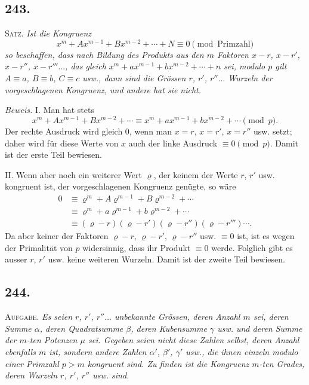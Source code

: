 \documentclass[12pt]{article}
\begin{document}
\subsection*{243.}
\textsc{Satz.} \textit{Ist die Kongruenz}
\[
x^m+A x^{m-1}+B x^{m-2}+\cdots+N\equiv 0\pmod{\text{Primzahl}}
\]
\textit{so beschaffen, dass nach Bildung des Produkts aus den $m$ Faktoren $x-r$, $x-r'$, $x-r''$, $x-r'''\ldots$, das gleich $x^m+a x^{m-1}+b x^{m-2}+\cdots+n$ sei, modulo $p$ gilt $A\equiv a$, $B\equiv b$, $C\equiv c$ usw., dann sind die Grössen $r$, $r'$, $r''\ldots$ Wurzeln der vorgeschlagenen Kongruenz, und andere hat sie nicht.}

\textit{Beweis.} I. Man hat stets
\[
x^m+A x^{m-1}+B x^{m-2}+\cdots \equiv x^m+a x^{m-1}+b x^{m-2}+\cdots \pmod p.
\]
Der rechte Ausdruck wird gleich $0$, wenn man $x=r$, $x=r'$, $x=r''$ usw. setzt; daher wird für diese Werte von $x$ auch der linke Ausdruck $\equiv 0\pmod p$. Damit ist der erste Teil bewiesen.

II. Wenn aber noch ein weiterer Wert $\varrho$, der keinem der Werte $r$, $r'$ usw. kongruent ist, der vorgeschlagenen Kongruenz genügte, so wäre
\[
\begin{aligned}
0&\equiv \varrho^m+A\varrho^{m-1}+B\varrho^{m-2}+\cdots \\
&\equiv \varrho^m+a\varrho^{m-1}+b\varrho^{m-2}+\cdots \\
&\equiv (\varrho-r)(\varrho-r')(\varrho-r'')(\varrho-r''')\cdots .
\end{aligned}
\]
Da aber keiner der Faktoren $\varrho-r$, $\varrho-r'$, $\varrho-r''$ usw. $\equiv 0$ ist, ist es wegen der Primalität von $p$ widersinnig, dass ihr Produkt $\equiv 0$ werde. Folglich gibt es ausser $r$, $r'$ usw. keine weiteren Wurzeln. Damit ist der zweite Teil bewiesen.

\subsection*{244.}
\textsc{Aufgabe.} \textit{Es seien $r$, $r'$, $r''\ldots$ unbekannte Grössen, deren Anzahl $m$ sei, deren Summe $\alpha$, deren Quadratsumme $\beta$, deren Kubensumme $\gamma$ usw. und deren Summe der $m$-ten Potenzen $\mu$ sei. Gegeben seien nicht diese Zahlen selbst, deren Anzahl ebenfalls $m$ ist, sondern andere Zahlen $\alpha'$, $\beta'$, $\gamma'$ usw., die ihnen einzeln modulo einer Primzahl $p>m$ kongruent sind. Zu finden ist die Kongruenz $m$-ten Grades, deren Wurzeln $r$, $r'$, $r''$ usw. sind.}
\end{document}

